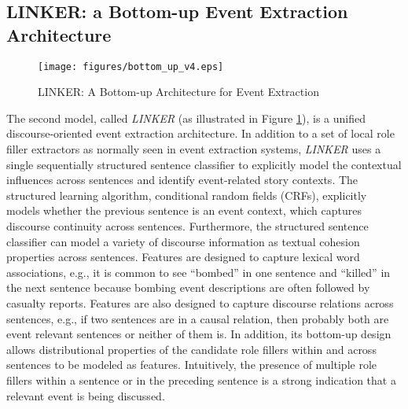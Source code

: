\subsection{LINKER: a Bottom-up Event Extraction Architecture}
\begin{figure}[htbp]
 \centering
 \texttt{[image: figures/bottom\_up\_v4.eps]}
 \caption{LINKER: A Bottom-up Architecture for Event Extraction}
\label{LINKER_flow_chart}
\end{figure} 
The second model, called {\it LINKER} (as illustrated in Figure \ref{LINKER_flow_chart}), is a 
unified discourse-oriented event extraction architecture. 
In addition to a set of local role filler extractors as 
normally seen in event extraction systems,  {\it LINKER} uses a single 
sequentially structured sentence classifier to explicitly model the contextual influences across sentences 
and identify event-related story contexts.
The structured learning algorithm, conditional random fields (CRFs), explicitly models whether the previous
sentence is an event context, which captures discourse continuity across sentences.
Furthermore, the structured sentence classifier can model 
a variety of discourse information as textual cohesion properties across sentences.
Features are designed to capture 
lexical word
associations, e.g., it is common to see ``bombed'' in one sentence and ``killed'' in the next sentence 
because bombing event descriptions are often followed by casualty reports.
Features are also designed to capture 
discourse relations across sentences, e.g., if two sentences are in a causal relation, 
then probably both are event relevant sentences or neither of them is.
In addition,
its bottom-up design allows distributional properties of the candidate role fillers within
and across sentences to be modeled as features. Intuitively, the presence of multiple role
fillers within a sentence or in the preceding sentence is a
strong indication that a relevant event is being discussed.

